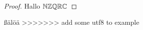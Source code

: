 \documentclass{article}
\author{Max Mustermann (212125465) \\ Mr Maxmeier (5289612)}
\begin{document}
  \maketitle

  \begin{proof} Hallo $\mathbb{N} \mathbb{Z} \mathbb{Q} \mathbb{R} \mathbb{C}$ \end{proof}
    ßälöä
>>>>>>> add some utf8 to example
\end{document}
